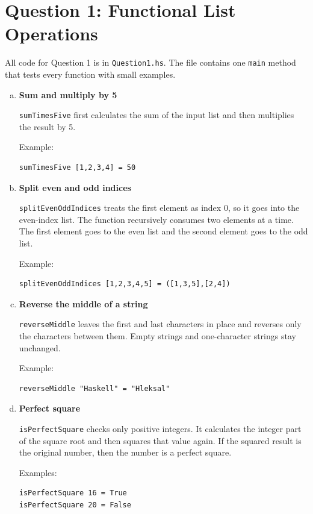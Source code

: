 \documentclass{article}
\begin{document}
\section*{Question 1: Functional List Operations}

All code for Question 1 is in \texttt{Question1.hs}. The file contains one \texttt{main} method that tests every function with small examples.

\begin{enumerate}[(a)]

\item \textbf{Sum and multiply by 5}

\texttt{sumTimesFive} first calculates the sum of the input list and then multiplies the result by 5.

Example:
\begin{verbatim}
sumTimesFive [1,2,3,4] = 50
\end{verbatim}

\item \textbf{Split even and odd indices}

\texttt{splitEvenOddIndices} treats the first element as index 0, so it goes into the even-index list. The function recursively consumes two elements at a time. The first element goes to the even list and the second element goes to the odd list.

Example:
\begin{verbatim}
splitEvenOddIndices [1,2,3,4,5] = ([1,3,5],[2,4])
\end{verbatim}

\item \textbf{Reverse the middle of a string}

\texttt{reverseMiddle} leaves the first and last characters in place and reverses only the characters between them. Empty strings and one-character strings stay unchanged.

Example:
\begin{verbatim}
reverseMiddle "Haskell" = "Hleksal"
\end{verbatim}

\item \textbf{Perfect square}

\texttt{isPerfectSquare} checks only positive integers. It calculates the integer part of the square root and then squares that value again. If the squared result is the original number, then the number is a perfect square.

Examples:
\begin{verbatim}
isPerfectSquare 16 = True
isPerfectSquare 20 = False
\end{verbatim}


\end{enumerate}
\end{document}
